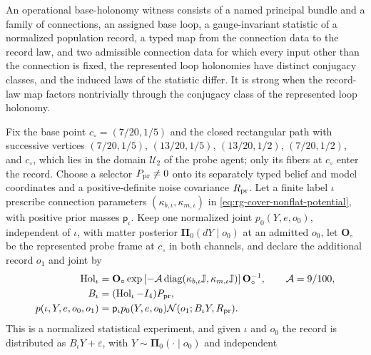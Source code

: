 An operational base-holonomy witness consists of a named principal bundle and a
family of connections, an assigned base loop, a gauge-invariant statistic of a
normalized population record, a typed map from the connection data to the record
law, and two admissible connection data for which every input other than the
connection is fixed, the represented loop holonomies have distinct conjugacy
classes, and the induced laws of the statistic differ. It is strong when the
record-law map factors nontrivially through the conjugacy class of the
represented loop holonomy.

Fix the base point \(c_\circ=(7/20,1/5)\) and the closed rectangular path with
successive vertices \((7/20,1/5)\), \((13/20,1/5)\), \((13/20,1/2)\),
\((7/20,1/2)\), and \(c_\circ\), which lies in the domain \(\mathcal U_2\) of the
probe agent; only its fibers at \(c_\circ\) enter the record. Choose a selector
\(P_{\rm pr}\ne0\) onto its separately typed belief and model coordinates and a
positive-definite noise covariance \(R_{\rm pr}\). Let a finite label \(\iota\)
prescribe connection parameters \((\kappa_{b,\iota},\kappa_{m,\iota})\) in
\eqref{eq:rg-cover-nonflat-potential}, with positive prior masses
\(\mathsf p_\iota\). Keep one normalized joint \(p_0(Y,e,o_0)\), independent of
\(\iota\), with matter posterior \(\boldsymbol\Pi_0(dY\mid o_0)\) at an admitted
\(o_0\), let \(\mathbf O_\circ\) be the represented probe frame at \(c_\circ\) in
both channels, and declare the additional record \(o_1\) and joint by
\begin{equation}
\begin{aligned}
 \operatorname{Hol}_\iota&=\mathbf O_\circ\exp\left[-\mathcal A
       \operatorname{diag}(\kappa_{b,\iota}\mathbb J,\kappa_{m,\iota}\mathbb J)\right]\mathbf O_\circ^{-1},
 \qquad \mathcal A=9/100,\\
 B_\iota&=(\operatorname{Hol}_\iota-I_4)P_{\rm pr},\\
 p(\iota,Y,e,o_0,o_1)&=\mathsf p_\iota p_0(Y,e,o_0)
                       \mathcal N(o_1;B_\iota Y,R_{\rm pr}).
\end{aligned}
\label{eq:rg-cover-loop-observation}
\end{equation}
This is a normalized statistical experiment, and given \(\iota\) and \(o_0\) the
record is distributed as \(B_\iota Y+\varepsilon\), with
\(Y\sim\boldsymbol\Pi_0(\cdot\mid o_0)\) and independent
